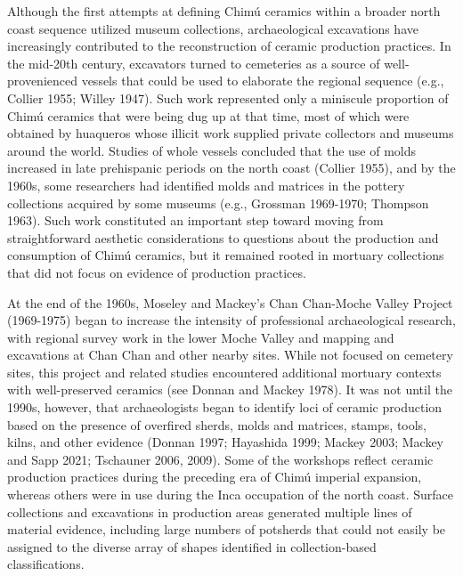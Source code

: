 \documentclass[]{interact}
\theoremstyle{plain}%
\theoremstyle{definition}
\theoremstyle{remark}
\begin{document}
Although the first attempts at defining Chimú ceramics within a broader
north coast sequence utilized museum collections, archaeological
excavations have increasingly contributed to the reconstruction of
ceramic production practices. In the mid-20th century, excavators turned
to cemeteries as a source of well-provenienced vessels that could be
used to elaborate the regional sequence (e.g., Collier 1955; Willey
1947). Such work represented only a miniscule proportion of Chimú
ceramics that were being dug up at that time, most of which were
obtained by huaqueros whose illicit work supplied private collectors and
museums around the world. Studies of whole vessels concluded that the
use of molds increased in late prehispanic periods on the north coast
(Collier 1955), and by the 1960s, some researchers had identified molds
and matrices in the pottery collections acquired by some museums (e.g.,
Grossman 1969-1970; Thompson 1963). Such work constituted an important
step toward moving from straightforward aesthetic considerations to
questions about the production and consumption of Chimú ceramics, but it
remained rooted in mortuary collections that did not focus on evidence
of production practices.

At the end of the 1960s, Moseley and Mackey's Chan Chan-Moche Valley
Project (1969-1975) began to increase the intensity of professional
archaeological research, with regional survey work in the lower Moche
Valley and mapping and excavations at Chan Chan and other nearby sites.
While not focused on cemetery sites, this project and related studies
encountered additional mortuary contexts with well-preserved ceramics
(see Donnan and Mackey 1978). It was not until the 1990s, however, that
archaeologists began to identify loci of ceramic production based on the
presence of overfired sherds, molds and matrices, stamps, tools, kilns,
and other evidence (Donnan 1997; Hayashida 1999; Mackey 2003; Mackey and
Sapp 2021; Tschauner 2006, 2009). Some of the workshops reflect ceramic
production practices during the preceding era of Chimú imperial
expansion, whereas others were in use during the Inca occupation of the
north coast. Surface collections and excavations in production areas
generated multiple lines of material evidence, including large numbers
of potsherds that could not easily be assigned to the diverse array of
shapes identified in collection-based classifications.
\end{document}
